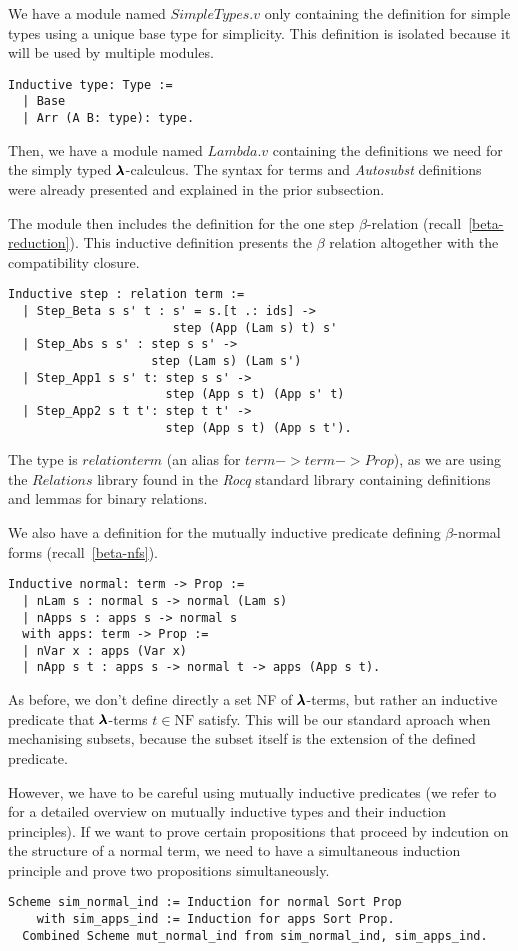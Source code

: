 We have a module named \lst$SimpleTypes.v$ only containing the definition for simple types using a unique base type for simplicity.
This definition is isolated because it will be used by multiple modules.
\begin{lstlisting}[language=Coq]
  Inductive type: Type :=
  | Base
  | Arr (A B: type): type.
\end{lstlisting}

Then, we have a module named \lst$Lambda.v$ containing the definitions we need for the simply typed $\pmb{\lambda}$-calculcus.
The syntax for terms and \textit{Autosubst} definitions were already presented and explained in the prior subsection.

The module then includes the definition for the one step $\beta$-relation (recall~\cref{beta-reduction}).
This inductive definition presents the $\beta$ relation altogether with the compatibility closure.
\begin{lstlisting}[language=Coq]
  Inductive step : relation term :=
  | Step_Beta s s' t : s' = s.[t .: ids] ->
                       step (App (Lam s) t) s'
  | Step_Abs s s' : step s s' ->
                    step (Lam s) (Lam s')
  | Step_App1 s s' t: step s s' ->
                      step (App s t) (App s' t)
  | Step_App2 s t t': step t t' ->
                      step (App s t) (App s t').
\end{lstlisting}

The type is \lst$relation term$ (an alias for \lst$term->term->Prop$), as we are using the \lst$Relations$ library found in the \textit{Rocq} standard library containing definitions and lemmas for binary relations. 

We also have a definition for the mutually inductive predicate defining $\beta$-normal forms (recall~\cref{beta-nfs}).
\begin{lstlisting}[language=Coq]
  Inductive normal: term -> Prop :=
  | nLam s : normal s -> normal (Lam s)
  | nApps s : apps s -> normal s  
  with apps: term -> Prop :=
  | nVar x : apps (Var x)
  | nApp s t : apps s -> normal t -> apps (App s t).
\end{lstlisting}

As before, we don't define directly a set NF of $\pmb{\lambda}$-terms, but rather an inductive predicate that $\pmb{\lambda}$-terms $t \in \text{NF}$ satisfy.
This will be our standard aproach when mechanising subsets, because the subset itself is the extension of the defined predicate.

However, we have to be careful using mutually inductive predicates (we refer to~\cite[Chapter~14]{CoqArt} for a detailed overview on mutually inductive types and their induction principles).
If we want to prove certain propositions that proceed by indcution on the structure of a normal term, we need to have a simultaneous induction principle and prove two propositions simultaneously.
\begin{lstlisting}[language=Coq]
  Scheme sim_normal_ind := Induction for normal Sort Prop
    with sim_apps_ind := Induction for apps Sort Prop.
  Combined Scheme mut_normal_ind from sim_normal_ind, sim_apps_ind.
\end{lstlisting}

